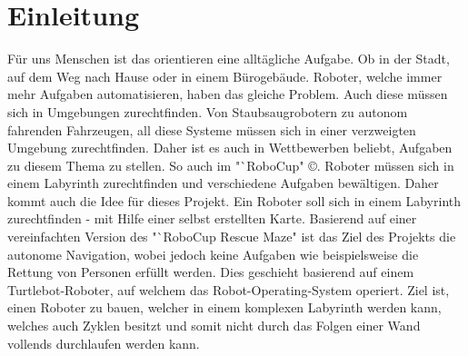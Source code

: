 \section{Einleitung}
{
	Für uns Menschen ist das orientieren eine alltägliche Aufgabe. Ob in der Stadt, auf dem Weg nach Hause oder in einem Bürogebäude. Roboter, welche immer mehr Aufgaben automatisieren, haben das gleiche Problem. Auch diese müssen sich in Umgebungen zurechtfinden. Von Staubsaugrobotern zu autonom fahrenden Fahrzeugen, all diese Systeme müssen sich in einer verzweigten Umgebung zurechtfinden. Daher ist es auch in Wettbewerben beliebt, Aufgaben zu diesem Thema zu stellen. So auch im "`RoboCup" \copyright. Roboter müssen sich in einem Labyrinth zurechtfinden und verschiedene Aufgaben bewältigen. Daher kommt auch die Idee für dieses Projekt. Ein Roboter soll sich in einem Labyrinth zurechtfinden - mit Hilfe einer selbst erstellten Karte. Basierend auf einer vereinfachten Version des "`RoboCup Rescue Maze" ist das Ziel des Projekts die autonome Navigation, wobei jedoch keine Aufgaben wie beispielsweise die Rettung von Personen erfüllt werden. Dies geschieht basierend auf einem Turtlebot-Roboter, auf welchem das Robot-Operating-System operiert. Ziel ist, einen Roboter zu bauen, welcher in einem komplexen Labyrinth werden kann, welches auch Zyklen besitzt und somit nicht durch das Folgen einer Wand vollends durchlaufen werden kann.
}